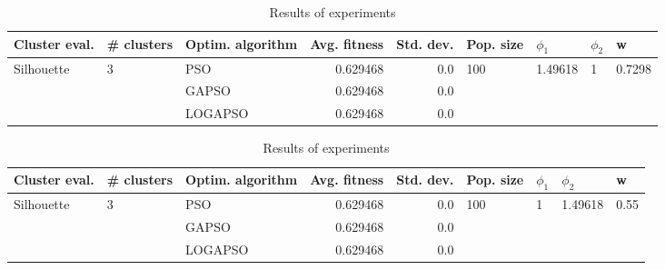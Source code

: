 \documentclass{article}
\begin{document}
\begin{table}
\centering
\caption{Results of experiments}
\begin{tabular}{lllrrllll}
\toprule
              Cluster eval. &        \# clusters & Optim. algorithm &  Avg. fitness &  Std. dev. &            Pop. size &               $\phi_{1}$ &         $\phi_{2}$ &                       w \\
\midrule
\multirow{3}{*}{Silhouette} & \multirow{3}{*}{3} &              PSO &      0.629468 &        0.0 & \multirow{3}{*}{100} & \multirow{3}{*}{1.49618} & \multirow{3}{*}{1} & \multirow{3}{*}{0.7298} \\
                            &                    &            GAPSO &      0.629468 &        0.0 &                      &                          &                    &                         \\
                            &                    &          LOGAPSO &      0.629468 &        0.0 &                      &                          &                    &                         \\
\bottomrule
\end{tabular}
\end{table}
\begin{table}
\centering
\caption{Results of experiments}
\begin{tabular}{lllrrllll}
\toprule
              Cluster eval. &        \# clusters & Optim. algorithm &  Avg. fitness &  Std. dev. &            Pop. size &         $\phi_{1}$ &               $\phi_{2}$ &                     w \\
\midrule
\multirow{3}{*}{Silhouette} & \multirow{3}{*}{3} &              PSO &      0.629468 &        0.0 & \multirow{3}{*}{100} & \multirow{3}{*}{1} & \multirow{3}{*}{1.49618} & \multirow{3}{*}{0.55} \\
                            &                    &            GAPSO &      0.629468 &        0.0 &                      &                    &                          &                       \\
                            &                    &          LOGAPSO &      0.629468 &        0.0 &                      &                    &                          &                       \\
\bottomrule
\end{tabular}
\end{table}
\end{document}
